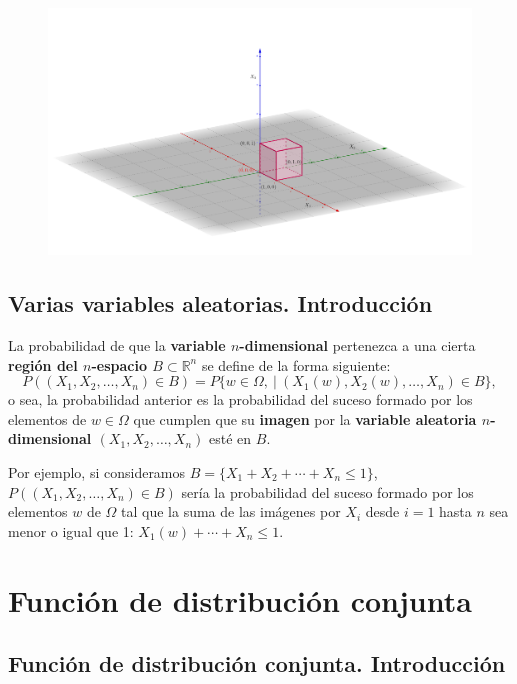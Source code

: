 \documentclass[]{book}
\begin{document}
\begin{figure}
\includegraphics[width=950px]{Images/Ej3DCubo} \end{figure}

\hypertarget{varias-variables-aleatorias.-introducciuxf3n-5}{%
\subsection{Varias variables aleatorias. Introducción}\label{varias-variables-aleatorias.-introducciuxf3n-5}}

La probabilidad de que la \textbf{variable \(n\)-dimensional} pertenezca a una cierta \textbf{región del \(n\)-espacio \(B\subset \mathbb{R}^n\)} se define de la forma siguiente:
\[
P((X_1,X_2,\ldots,X_n)\in B)=P\{w\in \Omega,\ |\ (X_1(w),X_2(w),\ldots,X_n)\in B\},
\]
o sea, la probabilidad anterior es la probabilidad del suceso formado por los elementos de \(w\in\Omega\) que cumplen que su \textbf{imagen} por la \textbf{variable aleatoria \(n\)-dimensional \((X_1,X_2,\ldots,X_n)\)} esté en \(B\).

Por ejemplo, si consideramos \(B=\{X_1+X_2+\cdots +X_n\leq 1\}\), \(P((X_1,X_2,\ldots,X_n)\in B)\) sería la probabilidad del suceso formado por los elementos \(w\) de \(\Omega\) tal que la suma de las imágenes por \(X_i\) desde \(i=1\) hasta \(n\) sea menor o igual que 1: \(X_1(w)+\cdots +X_n\leq 1\).

\hypertarget{funciuxf3n-de-distribuciuxf3n-conjunta-1}{%
\section{Función de distribución conjunta}\label{funciuxf3n-de-distribuciuxf3n-conjunta-1}}

\hypertarget{funciuxf3n-de-distribuciuxf3n-conjunta.-introducciuxf3n-3}{%
\subsection{Función de distribución conjunta. Introducción}\label{funciuxf3n-de-distribuciuxf3n-conjunta.-introducciuxf3n-3}}
\end{document}
